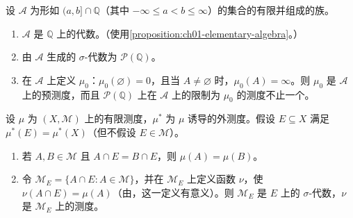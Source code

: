 \documentclass[../../main.tex]{subfiles}%
\begin{document}
\begin{exercise}\label{exercise:ch01-nonunique-extension}
设 $\mathscr{A}$ 为形如 $(a,b]\cap\mathbb{Q}$（其中 $-\infty\leqslant a<b\leqslant\infty$）的集合的有限并组成的族。
\begin{enumerate}[label=\alph*.,ref=(\alph*)]
\item\label{item:ch01-rational-interval-algebra} $\mathscr{A}$ 是 $\mathbb{Q}$ 上的代数。（使用\cref{proposition:ch01-elementary-algebra}。）
\item\label{item:ch01-rational-interval-generated} 由 $\mathscr{A}$ 生成的 $\sigma$-代数为 $\mathscr{P}(\mathbb{Q})$。
\item\label{item:ch01-rational-interval-infinite-measure} 在 $\mathscr{A}$ 上定义 $\mu_0$：$\mu_0(\varnothing)=0$，且当 $A\ne\varnothing$ 时，$\mu_0(A)=\infty$。则 $\mu_0$ 是 $\mathscr{A}$ 上的预测度，而且 $\mathscr{P}(\mathbb{Q})$ 上在 $\mathscr{A}$ 上的限制为 $\mu_0$ 的测度不止一个。
\end{enumerate}
\end{exercise}

\begin{exercise}\label{exercise:ch01-full-outer-measure-restriction}
设 $\mu$ 为 $(X,\mathscr{M})$ 上的有限测度，$\mu^*$ 为 $\mu$ 诱导的外测度。假设 $E\subseteq X$ 满足 $\mu^*(E)=\mu^*(X)$（但不假设 $E\in\mathscr{M}$）。
\begin{enumerate}[label=\alph*.,ref=(\alph*)]
\item\label{item:ch01-full-outer-measure-equality} 若 $A,B\in\mathscr{M}$ 且 $A\cap E=B\cap E$，则 $\mu(A)=\mu(B)$。
\item\label{item:ch01-full-outer-measure-trace} 令 $\mathscr{M}_E=\{A\cap E:A\in\mathscr{M}\}$，并在 $\mathscr{M}_E$ 上定义函数 $\nu$，使 $\nu(A\cap E)=\mu(A)$（由，这一定义有意义）。则 $\mathscr{M}_E$ 是 $E$ 上的 $\sigma$-代数，$\nu$ 是 $\mathscr{M}_E$ 上的测度。
\end{enumerate}
\end{exercise}
\end{document}
